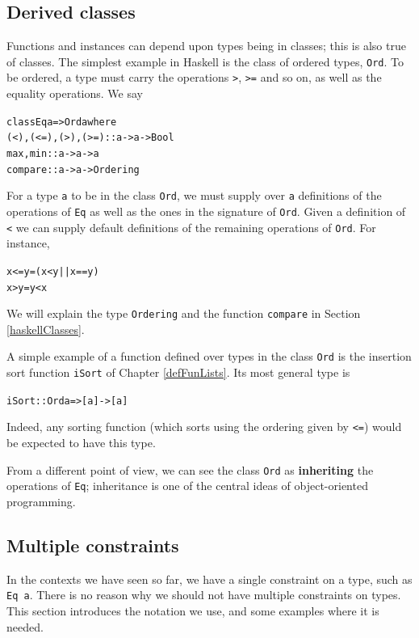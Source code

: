 \subsection*{Derived classes}

Functions and instances can depend upon types being in classes; this is also
true of classes. The simplest example in Haskell is the class of ordered
types,
\texttt{Ord}. To be ordered, a type must carry the operations \texttt{>}, \texttt{>=}
and so on, as well as the equality operations. We say
\begin{alltt}
class Eq a => Ord a where
  (<), (<=), (>), (>=) :: a -> a -> Bool
  max, min             :: a -> a -> a
  compare              :: a -> a -> Ordering
\end{alltt}
For a type \texttt{a} to be
in the class \texttt{Ord}, we must supply over
\texttt{a} definitions of the operations of
\texttt{Eq} 
as well as the ones in the signature of \texttt{Ord}. Given a definition of 
\texttt{<} we can supply default definitions of the remaining operations of 
\texttt{Ord}.
For instance,
\begin{alltt}
x <= y     = (x < y || x == y)
x >  y     =  y < x
\end{alltt}
We will explain the type \texttt{Ordering} and the function \texttt{compare}
in Section \ref{haskellClasses}.

A simple example of a function defined over types in the class \texttt{Ord} is the
insertion sort function \texttt{iSort} of Chapter \ref{defFunLists}. Its most general type is
\begin{alltt}
iSort :: Ord a => [a] -> [a]
\end{alltt}
Indeed, any sorting function (which sorts using the ordering given by 
\texttt{<=}) would be expected to have this type.

From a different point of view, we can see the class \texttt{Ord} as 
\textbf{inheriting} the operations of \texttt{Eq}; inheritance is one of the central
ideas of object-oriented programming.

\subsection*{Multiple constraints}

In the contexts we have seen so far, we have a single constraint on a type,
such as \texttt{Eq a}. There is no reason why we should not have multiple
constraints on types. This section introduces the notation we use, and some
examples where it is needed.

